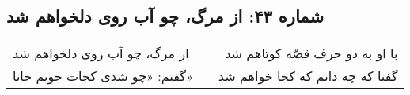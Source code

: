 \begin{center}
\section*{شماره ۴۳: از مرگ، چو آب روی دلخواهم شد}
\label{sec:043}
\begin{longtable}{l p{0.5cm} r}
از مرگ، چو آب روی دلخواهم شد
&&
با او به دو حرف قصّه کوتاهم شد
\\
گفتم: «چو شدی کجات جویم جانا»
&&
گفتا که چه دانم که کجا خواهم شد
\\
\end{longtable}
\end{center}
